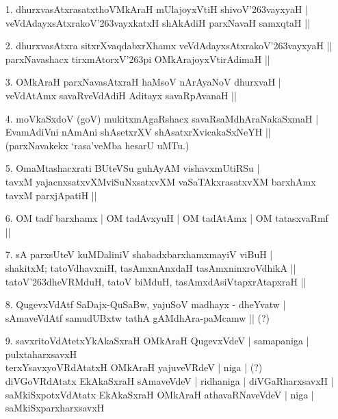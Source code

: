 \begin{itemize}
\item[1.] dhurxvasAtxrasatxthoVMkAraH mUlajoyxVtiH shivoV\char'263vayxyaH |\\\label{155}
veVdAdayxsAtxrakoV\char'263vayxkatxH shAkAdiH parxNavaH samxqtaH ||
\item[2.] dhurxvasAtxra sitxrXvaqdabxrXhamx veVdAdayxsAtxrakoV\char'263vayxyaH ||\\\label{155}
parxNavashacx tirxmAtorxV\char'263pi OMkArajoyxVtirAdimaH ||
\item[3.] OMkAraH parxNavasAtxraH haMsoV nArAyaNoV dhurxvaH |\\\label{155}
veVdAtAmx savaRveVdAdiH Aditayx savaRpAvanaH ||
\item[4.] moVkaSxdoV (goV) mukitxmAgaRshacx savaRsaMdhAraNakaSxmaH |\\
EvamAdiVni nAmAni shAsetxrXV shAsatxrXvicakaSxNeYH ||\\
(parxNavakekx `rasa'veMba hesarU uMTu.)
\item[5.] OmaMtashacxrati BUteVSu guhAyAM vishavxmUtiRSu |\\\label{156}
tavxM yajacnxsatxvXMviSuNxsatxvXM vaSaTAkxrasatxvXM barxhAmx tavxM parxjApatiH ||
\item[6.] OM tadf barxhamx | OM tadAvxyuH | OM tadAtAmx | OM tatasxvaRmf ||\label{156}
\item[7.] sA parxsUteV kuMDaliniV shabadxbarxhamxmayiV viBuH |\\
shakitxM; tatoVdhavxniH, tasAmxnAnxdaH tasAmxninxroVdhikA ||\\
tatoV\char'263dheVRMduH, tatoV biMduH, tasAmxdAsiVtapxrAtapxraH ||
\item[8.] QugevxVdAtf SaDajx-QuSaBw, yajuSoV madhayx - dheYvatw |\\\label{156}
sAmaveVdAtf samudUBxtw tathA gAMdhAra-paMcamw || (?)
\item[9.] savxritoVdAtetxYkAkaSxraH\label{156} OMkAraH QugevxVdeV | samapaniga | pulxtaharxsavxH \\
terxYsavxyoVRdAtatxH OMkAraH yajuveVRdeV | niga | (?)\\
diVGoVRdAtatx EkAkaSxraH sAmaveVdeV | ridhaniga | diVGaRharxsavxH |\\
saMkiSxpotxVdAtatx EkAkaSxraH OMkAraH athavaRNaveVdeV | niga |\\
saMkiSxparxharxsavxH
\end{itemize}

